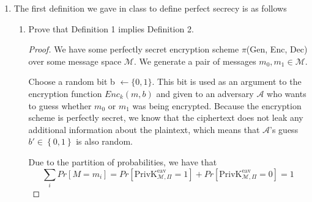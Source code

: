 \documentclass{article}
\begin{document}
\begin{enumerate}
\begin{enumerate}
\begin{proof}
        $Pr[M = m | C = c) = P(M = m]$\newline

        This implies that $Pr[M = m_0 | C = c] = Pr[M = m_0]$ and $Pr[M = m_1 | C = c] = Pr[M = m_1]$. We then find that $Pr[M = m_0 \mid C = c] =
          Pr[M = m_0] \neq Pr[M = m_1] = Pr[M = m_1 \mid C = c]$ by the current probability distribution. This contradicts the initial assumption that $Pr[M = m_1 | C = c] = Pr[M = m_1 \mid C = c]$
        
        \end{proof}

      \item An encryption scheme with message space M is perfectly secret if and 
        only if for every probability distribution over $\mathcal{M}$ and every
        $c_0, c_1 \in C$ 
        we have $Pr\left[C = c_0\right] = Pr\left[C = c_1\right]$.

        \textbf{FIXME}
        
    \end{enumerate}
  \item The first definition we gave in class to define perfect secrecy is as follows
    \begin{enumerate}
      \item Prove that Definition 1 implies Definition 2.

        \begin{proof}
          We have some perfectly secret encryption scheme $\pi$(Gen, Enc, Dec) over some message 
          space $\mathcal{M}$. We generate a pair of messages 
          $m_0, m_1 \in \mathcal{M}$.\newline

          Choose a random bit b $\leftarrow \{0, 1\}$. This bit is used as an argument to the encryption function $Enc_k(m, b)$ and given to an adversary $\mathcal{A}$ who wants to guess whether $m_0$ or $m_1$ was being encrypted. Because the encryption scheme is perfectly secret, we know that the ciphertext does not leak any additional information about the plaintext, which means that $\mathcal{A}$'s guess $b' \in \left\{0, 1\right\}$ is also random.\newline
          
            Due to the partition of probabilities, we have that
          \[
            \sum\limits_i Pr[M = m_i] =  
            Pr[\text{PrivK}_{\mathcal{M}, \Pi}^{\text{eav}} = 1] + 
            Pr[\text{PrivK}_{\mathcal{M}, \Pi}^{\text{eav}} = 0] = 1
          \]
          

\end{proof}
\end{enumerate}
\end{enumerate}
\end{document}
